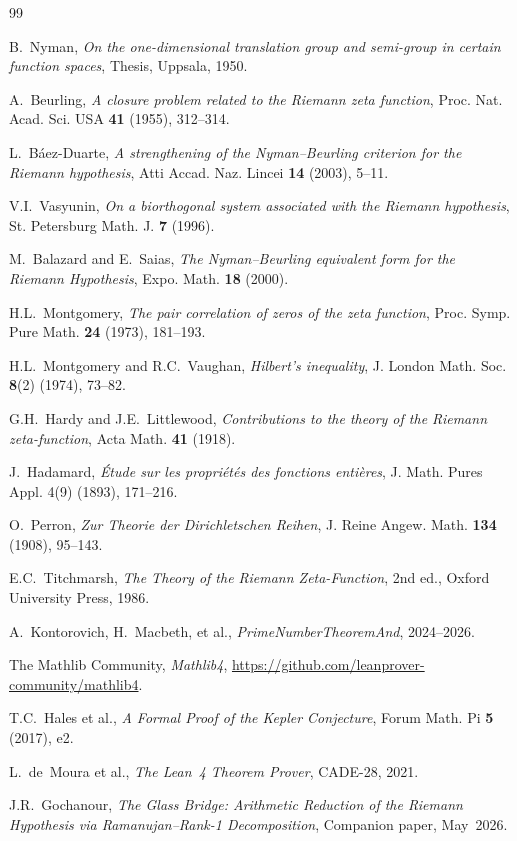 \documentclass[11pt,a4paper]{article}
\begin{document}
\begin{thebibliography}{99}

B.~Nyman, \emph{On the one-dimensional translation group and
semi-group in certain function spaces}, Thesis, Uppsala, 1950.

A.~Beurling, \emph{A closure problem related to the Riemann zeta
function}, Proc. Nat. Acad. Sci. USA \textbf{41} (1955), 312--314.

L.~B\'aez-Duarte, \emph{A strengthening of the Nyman--Beurling
criterion for the Riemann hypothesis}, Atti Accad. Naz. Lincei
\textbf{14} (2003), 5--11.

V.I.~Vasyunin, \emph{On a biorthogonal system associated with the
Riemann hypothesis}, St. Petersburg Math. J. \textbf{7} (1996).

M.~Balazard and E.~Saias, \emph{The Nyman--Beurling equivalent form
for the Riemann Hypothesis}, Expo. Math. \textbf{18} (2000).

H.L.~Montgomery, \emph{The pair correlation of zeros of the zeta
function}, Proc. Symp. Pure Math. \textbf{24} (1973), 181--193.

H.L.~Montgomery and R.C.~Vaughan, \emph{Hilbert's inequality},
J. London Math. Soc. \textbf{8}(2) (1974), 73--82.

G.H.~Hardy and J.E.~Littlewood, \emph{Contributions to the theory
of the Riemann zeta-function}, Acta Math. \textbf{41} (1918).

J.~Hadamard, \emph{\'Etude sur les propri\'et\'es des fonctions
enti\`eres}, J. Math. Pures Appl. 4(9) (1893), 171--216.

O.~Perron, \emph{Zur Theorie der Dirichletschen Reihen},
J. Reine Angew. Math. \textbf{134} (1908), 95--143.

E.C.~Titchmarsh, \emph{The Theory of the Riemann Zeta-Function},
2nd ed., Oxford University Press, 1986.

A.~Kontorovich, H.~Macbeth, et al.,
\emph{PrimeNumberTheoremAnd}, 2024--2026.

The Mathlib Community, \emph{Mathlib4},
\url{https://github.com/leanprover-community/mathlib4}.

T.C.~Hales et al., \emph{A Formal Proof of the Kepler Conjecture},
Forum Math. Pi \textbf{5} (2017), e2.

L.~de~Moura et al., \emph{The Lean~4 Theorem Prover}, CADE-28, 2021.

J.R.~Gochanour, \emph{The Glass Bridge: Arithmetic Reduction of the
Riemann Hypothesis via Ramanujan--Rank-1 Decomposition},
Companion paper, May~2026.

\end{thebibliography}
\end{document}
